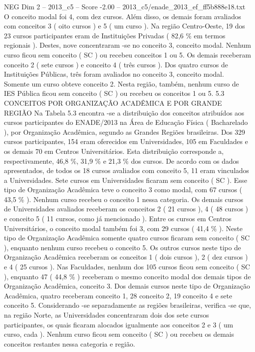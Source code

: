 \begin{textsample}{NEG Dim 2 – 2013\_c5 – Score -2.00 – 2013\_c5/enade\_2013\_ef\_ff5b888e18.txt}
O conceito modal foi 4, com dez cursos.
Além disso, os demais foram avaliados com conceitos 3 ( oito cursos ) e 5 ( um curso ).
Na região Centro-Oeste, 19 dos 23 cursos participantes eram de Instituições Privadas ( 82,6 \% em termos regionais ).
Destes, nove concentraram -se no conceito 3, conceito modal.
Nenhum curso ficou sem conceito ( SC ) ou recebeu conceitos 1 ou 5.
Os demais receberam conceito 2 ( sete cursos ) e conceito 4 ( três cursos ).
Dos quatro cursos de Instituições Públicas, três foram avaliados no conceito 3, conceito modal.
Somente um curso obteve conceito 2.
Nesta região, também, nenhum curso de IES Pública ficou sem conceito ( SC ) ou recebeu os conceitos 1 ou 5. 5.3 CONCEITOS POR ORGANIZAÇÃO ACADÊMICA E POR GRANDE REGIÃO Na Tabela 5.3 encontra -se a distribuição dos conceitos atribuídos aos cursos participantes do ENADE/2013 na Área de Educação Física ( Bacharelado ), por Organização Acadêmica, segundo as Grandes Regiões brasileiras.
Dos 329 cursos participantes, 154 eram oferecidos em Universidades, 105 em Faculdades e os demais 70 em Centros Universitários.
Esta distribuição corresponde a, respectivamente, 46,8 \%, 31,9 \% e 21,3 \% dos cursos.
De acordo com os dados apresentados, de todos os 18 cursos avaliados com conceito 5, 11 eram vinculados a Universidades.
Sete cursos em Universidades ficaram sem conceito ( SC ).
Esse tipo de Organização Acadêmica teve o conceito 3 como modal, com 67 cursos ( 43,5 \% ).
Nenhum curso recebeu o conceito 1 nessa categoria.
Os demais cursos de Universidades avaliados receberam os conceitos 2 ( 21 cursos ), 4 ( 48 cursos ) e conceito 5 ( 11 cursos, como já mencionado ).
Entre os cursos em Centros Universitários, o conceito modal também foi 3, com 29 cursos ( 41,4 \% ).
Neste tipo de Organização Acadêmica somente quatro cursos ficaram sem conceito ( SC ), enquanto nenhum curso recebeu o conceito 5.
Os outros cursos neste tipo de Organização Acadêmica receberam os conceitos 1 ( dois cursos ), 2 ( dez cursos ) e 4 ( 25 cursos ).
Nas Faculdades, nenhum dos 105 cursos ficou sem conceito ( SC ), enquanto 47 ( 44,8 \% ) receberam o mesmo conceito modal dos demais tipos de Organização Acadêmica, conceito 3.
Dos demais cursos neste tipo de Organização Acadêmica, quatro receberam conceito 1, 28 conceito 2, 19 conceito 4 e sete conceito 5.
Considerando -se separadamente as regiões brasileiras, verifica -se que, na região Norte, as Universidades concentraram dois dos sete cursos participantes, os quais ficaram alocados igualmente aos conceitos 2 e 3 ( um curso, cada ).
Nenhum curso ficou sem conceito ( SC ) ou recebeu os demais conceitos restantes nessa categoria e região.

\end{textsample}
